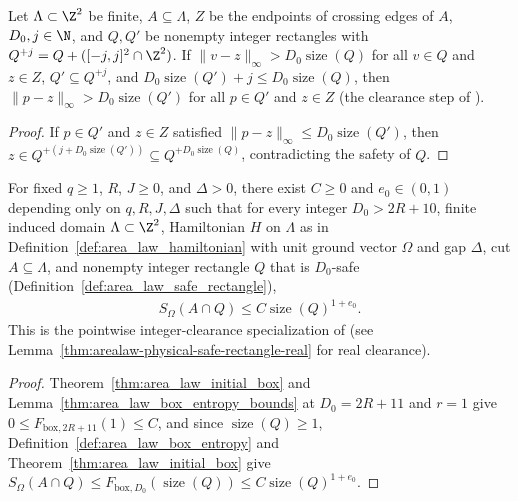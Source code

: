 \begin{lemma}
    \label{thm:area_law_safe_rectangle_dilation}
    \leanok
    Let $\Lambda\subset\Z^2$ be finite, $A\subseteq\Lambda$, $Z$ be the
    endpoints of crossing edges of $A$, $D_0,j\in\N$, and $Q,Q'$ be nonempty
    integer rectangles with $Q^{+j}=Q+([-j,j]^2\cap\Z^2)$. If
    $\|v-z\|_\infty>D_0\operatorname{size}(Q)$ for all $v\in Q$ and $z\in Z$,
    $Q'\subseteq Q^{+j}$, and
    $D_0\operatorname{size}(Q')+j\le D_0\operatorname{size}(Q)$, then
    $\|p-z\|_\infty>D_0\operatorname{size}(Q')$ for all $p\in Q'$ and $z\in Z$
    (the clearance step of
    \cite[proof of Proposition~9.5, lines~723--729]{OpenAI2026AreaLaw}).
\end{lemma}
\begin{proof}\leanok
    If $p\in Q'$ and $z\in Z$ satisfied
    $\|p-z\|_\infty\le D_0\operatorname{size}(Q')$, then
    $z\in Q^{+(j+D_0\operatorname{size}(Q'))}\subseteq Q^{+D_0\operatorname{size}(Q)}$,
    contradicting the safety of $Q$.
\end{proof}

\begin{lemma}
    \label{thm:area_law_initial_safe_rectangle_entropy}
    \leanok
    For fixed $q\ge1$, $R$, $J\ge0$, and $\Delta>0$, there exist $C\ge0$ and
    $e_0\in(0,1)$ depending only on $q,R,J,\Delta$ such that for every integer
    $D_0>2R+10$, finite induced domain $\Lambda\subset\Z^2$, Hamiltonian $H$
    on $\Lambda$ as in Definition~\ref{def:area_law_hamiltonian} with unit
    ground vector $\Omega$ and gap $\Delta$, cut $A\subseteq\Lambda$, and
    nonempty integer rectangle $Q$ that is $D_0$-safe
    (Definition~\ref{def:area_law_safe_rectangle}),
    \begin{align}
        S_\Omega(A\cap Q)
        \le C\operatorname{size}(Q)^{1+e_0}.
        \label{eq:area_law_initial_rectangle_entropy}
    \end{align}
    This is the pointwise integer-clearance specialization of
    \cite[Proposition~3.3]{OpenAI2026AreaLaw} (see
    Lemma~\ref{thm:arealaw-physical-safe-rectangle-real} for real clearance).
\end{lemma}
\begin{proof}\leanok
    Theorem~\ref{thm:area_law_initial_box} and Lemma~\ref{thm:area_law_box_entropy_bounds} at $D_0=2R+11$ and $r=1$ give
    $0\le F_{\mathrm{box},2R+11}(1)\le C$, and since $\operatorname{size}(Q)\ge1$,
    Definition~\ref{def:area_law_box_entropy} and
    Theorem~\ref{thm:area_law_initial_box} give
    $S_\Omega(A\cap Q)\le F_{\mathrm{box},D_0}(\operatorname{size}(Q))\le C\operatorname{size}(Q)^{1+e_0}$.
\end{proof}
